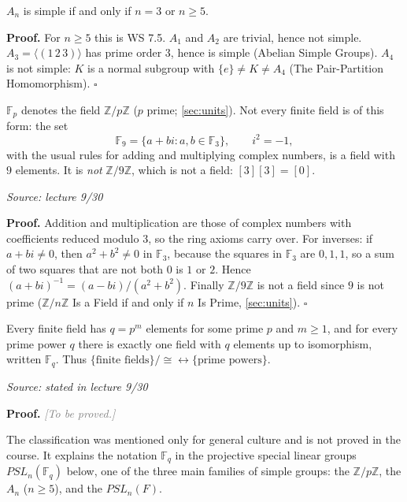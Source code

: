 \documentclass[11pt]{report}
\renewenvironment{proof}[1][Proof]{\noindent\textbf{#1.} }{\hfill$\square$\par\vspace{5pt}}
\newcommand{\proofpending}{\noindent\textbf{Proof.} \textcolor{gray}{\textit{[To be proved.]}}\par\vspace{5pt}}
\newcommand{\srcline}[1]{\par\hfill{\footnotesize\textit{Source: #1}}}
\begin{document}
\begin{corbox}\label{cor:which-an-simple}
$A_n$ is simple if and only if $n = 3$ or $n \geq 5$.
\end{corbox}

\begin{proof}
For $n \geq 5$ this is WS 7.5. $A_1$ and $A_2$ are trivial, hence not simple. $A_3 = \langle (1\,2\,3) \rangle$ has prime order $3$, hence is simple (Abelian Simple Groups). $A_4$ is not simple: $K$ is a normal subgroup with $\{e\} \neq K \neq A_4$ (The Pair-Partition Homomorphism).
\end{proof}



\begin{exbox}\label{ex:field-f9}
$\mathbb{F}_p$ denotes the field $\mathbb{Z}/p\mathbb{Z}$ ($p$ prime; \ref{sec:units}). Not every finite field is of this form: the set
\[ \mathbb{F}_9 = \{a + bi : a, b \in \mathbb{F}_3\}, \qquad i^2 = -1, \]
with the usual rules for adding and multiplying complex numbers, is a field with $9$ elements. It is \emph{not} $\mathbb{Z}/9\mathbb{Z}$, which is not a field: $[3][3] = [0]$.
\srcline{lecture 9/30}
\end{exbox}

\begin{proof}
Addition and multiplication are those of complex numbers with coefficients reduced modulo $3$, so the ring axioms carry over. For inverses: if $a + bi \neq 0$, then $a^2 + b^2 \neq 0$ in $\mathbb{F}_3$, because the squares in $\mathbb{F}_3$ are $0, 1, 1$, so a sum of two squares that are not both $0$ is $1$ or $2$. Hence $(a + bi)^{-1} = (a - bi)/(a^2 + b^2)$. Finally $\mathbb{Z}/9\mathbb{Z}$ is not a field since $9$ is not prime ($\mathbb{Z}/n\mathbb{Z}$ Is a Field if and only if $n$ Is Prime, \ref{sec:units}).
\end{proof}

\begin{thmbox}\label{thm:classification-finite-fields}
Every finite field has $q = p^m$ elements for some prime $p$ and $m \geq 1$, and for every prime power $q$ there is exactly one field with $q$ elements up to isomorphism, written $\mathbb{F}_q$. Thus $\{\text{finite fields}\}/{\cong} \longleftrightarrow \{\text{prime powers}\}$.
\srcline{stated in lecture 9/30}
\end{thmbox}

\proofpending

\begin{rembox}\label{rem:why-finite-fields-here}
The classification was mentioned only for general culture and is not proved in the course. It explains the notation $\mathbb{F}_q$ in the projective special linear groups $PSL_n(\mathbb{F}_q)$ below, one of the three main families of simple groups: the $\mathbb{Z}/p\mathbb{Z}$, the $A_n$ ($n \geq 5$), and the $PSL_n(F)$.
\end{rembox}
\end{document}
